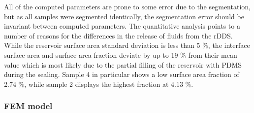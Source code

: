   All of the computed parameters are prone to some error due to the segmentation, but as all samples were segmented identically, the segmentation error should be invariant between computed parameters. The quantitative analysis points to a number of reasons for the differences in the release of fluids from the rDDS. While the reservoir surface area standard deviation is less than 5 \%, the interface surface area and surface area fraction deviate by up to 19 \% from their mean value which is most likely due to the partial filling of the reservoir with PDMS during the sealing. Sample 4 in particular shows a low surface area fraction of 2.74 \%, while sample 2 displays the highest fraction at 4.13 \%.

  \newpage
  \subsubsection*{FEM model}

